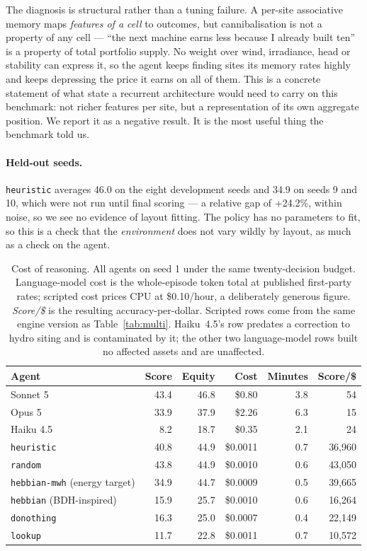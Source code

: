 The diagnosis is structural rather than a tuning failure. A per-site associative memory maps \emph{features of a cell} to outcomes, but cannibalisation is not a property of any cell --- ``the next machine earns less because I already built ten'' is a property of total portfolio supply. No weight over wind, irradiance, head or stability can express it, so the agent keeps finding sites its memory rates highly and keeps depressing the price it earns on all of them. This is a concrete statement of what state a recurrent architecture would need to carry on this benchmark: not richer features per site, but a representation of its own aggregate position. We report it as a negative result. It is the most useful thing the benchmark told us.

\paragraph{Held-out seeds.} \texttt{heuristic} averages 46.0 on the eight development seeds and 34.9 on seeds 9 and 10, which were not run until final scoring --- a relative gap of +24.2\%, within noise, so we see no evidence of layout fitting. The policy has no parameters to fit, so this is a check that the \emph{environment} does not vary wildly by layout, as much as a check on the agent.

\begin{table}[t]
\centering\small
\caption{Cost of reasoning. All agents on seed 1 under the same twenty-decision
budget. Language-model cost is the whole-episode token total at published
first-party rates; scripted cost prices CPU at \$0.10/hour, a deliberately
generous figure. \emph{Score/\$} is the resulting accuracy-per-dollar. Scripted rows come from
the same engine version as Table~\ref{tab:multi}. Haiku~4.5's row predates a
correction to hydro siting and is contaminated by it; the other two
language-model rows built no affected assets and are unaffected.}
\label{tab:cost}
\begin{tabular}{lrrrrr}
\toprule
Agent & Score & Equity & Cost & Minutes & Score/\$ \\
\midrule
Sonnet 5 & 43.4 & 46.8 & \$0.80 & 3.8 & 54 \\
Opus 5 & 33.9 & 37.9 & \$2.26 & 6.3 & 15 \\
Haiku 4.5 & 8.2 & 18.7 & \$0.35 & 2.1 & 24 \\
\midrule
\texttt{heuristic} & 40.8 & 44.9 & \$0.0011 & 0.7 & 36,960 \\
\texttt{random} & 43.8 & 44.9 & \$0.0010 & 0.6 & 43,050 \\
\texttt{hebbian-mwh} (energy target) & 34.9 & 44.7 & \$0.0009 & 0.5 & 39,665 \\
\texttt{hebbian} (BDH-inspired) & 15.9 & 25.7 & \$0.0010 & 0.6 & 16,264 \\
\texttt{donothing} & 16.3 & 25.0 & \$0.0007 & 0.4 & 22,149 \\
\texttt{lookup} & 11.7 & 22.8 & \$0.0011 & 0.7 & 10,572 \\
\bottomrule
\end{tabular}
\end{table}

